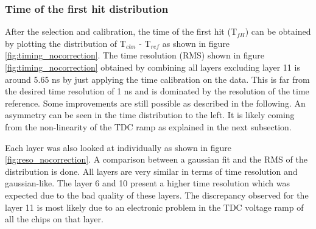 \subsubsection{Time of the first hit distribution}

After the selection and calibration, the time of the first hit (T$_{fH}$) can be obtained by plotting the distribution of T$_{chn}$ - T$_{ref}$ as shown in figure \ref{fig:timing_nocorrection}. The time resolution (RMS) shown in figure \ref{fig:timing_nocorrection} obtained by combining all layers excluding layer 11 is around 5.65 ns by just applying the time calibration on the data. This is far from the desired time resolution of 1 ns and is dominated by the resolution of the time reference. Some improvements are still possible as described in the following. An asymmetry can be seen in the time distribution to the left. It is likely coming from the non-linearity of the TDC ramp as explained in the next subsection.

Each layer was also looked at individually as shown in figure \ref{fig:reso_nocorrection}. A comparison between a gaussian fit and the RMS of the distribution is done. All layers are very similar in terms of time resolution and gaussian-like. The layer 6 and 10 present a higher time resolution which was expected due to the bad quality of these layers. The discrepancy observed for the layer 11 is most likely due to an electronic problem in the TDC voltage ramp of all the chips on that layer.


